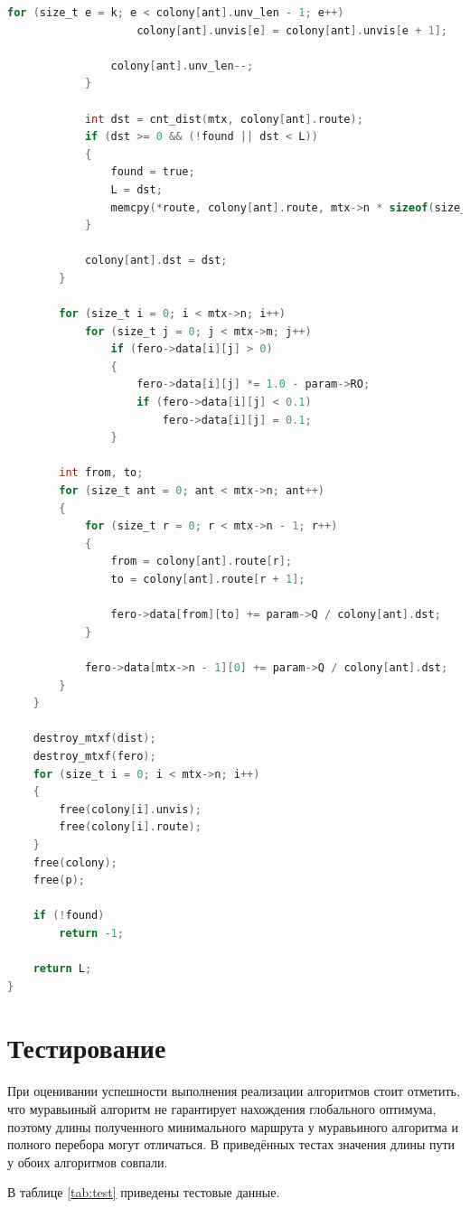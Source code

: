 \documentclass[12pt]{report}
\begin{document}
\begin{lstlisting}[language=C,caption={Муравьиный алгоритм},label=code]
				for (size_t e = k; e < colony[ant].unv_len - 1; e++)
					colony[ant].unvis[e] = colony[ant].unvis[e + 1]; 
				
				colony[ant].unv_len--;
			}
			
			int dst = cnt_dist(mtx, colony[ant].route);
			if (dst >= 0 && (!found || dst < L))
			{
				found = true;
				L = dst;
				memcpy(*route, colony[ant].route, mtx->n * sizeof(size_t));
			}
			
			colony[ant].dst = dst;
		}
		
		for (size_t i = 0; i < mtx->n; i++)
			for (size_t j = 0; j < mtx->m; j++)
				if (fero->data[i][j] > 0)
				{
					fero->data[i][j] *= 1.0 - param->RO;
					if (fero->data[i][j] < 0.1)
						fero->data[i][j] = 0.1;
				}
		
		int from, to;
		for (size_t ant = 0; ant < mtx->n; ant++)
		{
			for (size_t r = 0; r < mtx->n - 1; r++)
			{
				from = colony[ant].route[r];
				to = colony[ant].route[r + 1];
				
				fero->data[from][to] += param->Q / colony[ant].dst;
			}		

			fero->data[mtx->n - 1][0] += param->Q / colony[ant].dst;
		}
	}
	
	destroy_mtxf(dist);
	destroy_mtxf(fero);
	for (size_t i = 0; i < mtx->n; i++)
	{
		free(colony[i].unvis);
		free(colony[i].route);
	}
	free(colony);
	free(p);
	
	if (!found)
		return -1;
	
	return L;
}

\end{lstlisting}

\newpage

\section{Тестирование}

При оценивании успешности выполнения реализации алгоритмов стоит отметить, что муравьиный алгоритм не гарантирует нахождения глобального оптимума, поэтому длины полученного минимального маршрута у муравьиного алгоритма и полного перебора могут отличаться. В приведённых тестах значения длины пути у обоих алгоритмов совпали.

В таблице \ref{tab:test} приведены тестовые данные. 
\end{document}
